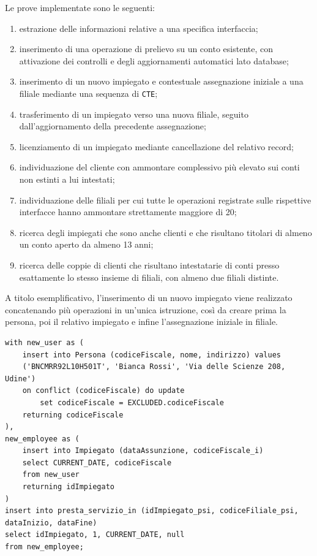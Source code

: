 Le prove implementate sono le seguenti:
\begin{enumerate}
  \item estrazione delle informazioni relative a una specifica interfaccia;
  \item inserimento di una operazione di prelievo su un conto esistente, con attivazione dei controlli e degli aggiornamenti automatici lato database;
  \item inserimento di un nuovo impiegato e contestuale assegnazione iniziale a una filiale mediante una sequenza di \texttt{CTE};
  \item trasferimento di un impiegato verso una nuova filiale, seguito dall'aggiornamento della precedente assegnazione;
  \item licenziamento di un impiegato mediante cancellazione del relativo record;
  \item individuazione del cliente con ammontare complessivo più elevato sui conti non estinti a lui intestati;
  \item individuazione delle filiali per cui tutte le operazioni registrate sulle rispettive interfacce hanno ammontare strettamente maggiore di 20;
  \item ricerca degli impiegati che sono anche clienti e che risultano titolari di almeno un conto aperto da almeno 13 anni;
  \item ricerca delle coppie di clienti che risultano intestatarie di conti presso esattamente lo stesso insieme di filiali, con almeno due filiali distinte.
\end{enumerate}

A titolo esemplificativo, l'inserimento di un nuovo impiegato viene realizzato concatenando più operazioni in un'unica istruzione, così da creare prima la persona, poi il relativo impiegato e infine l'assegnazione iniziale in filiale.

\begin{lstlisting}[caption={Inserimento di un nuovo impiegato e assegnazione iniziale}]
with new_user as (
    insert into Persona (codiceFiscale, nome, indirizzo) values
    ('BNCMRR92L10H501T', 'Bianca Rossi', 'Via delle Scienze 208, Udine')
    on conflict (codiceFiscale) do update
        set codiceFiscale = EXCLUDED.codiceFiscale
    returning codiceFiscale
),
new_employee as (
    insert into Impiegato (dataAssunzione, codiceFiscale_i)
    select CURRENT_DATE, codiceFiscale
    from new_user
    returning idImpiegato
)
insert into presta_servizio_in (idImpiegato_psi, codiceFiliale_psi, dataInizio, dataFine)
select idImpiegato, 1, CURRENT_DATE, null
from new_employee;
\end{lstlisting}

